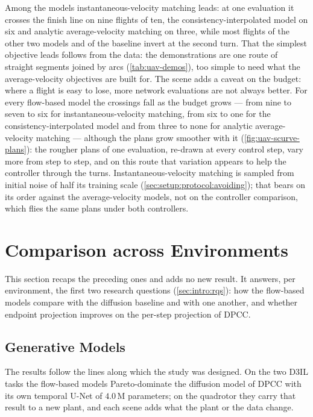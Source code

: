 Among the models instantaneous-velocity matching leads: at one evaluation it crosses the finish line on
nine flights of ten, the consistency-interpolated model on six and analytic average-velocity matching on
three, while most flights of the other two models and of the baseline invert at the second turn. That the
simplest objective leads follows from the data: the demonstrations are one route of straight segments
joined by arcs (\autoref{tab:uav-demos}), too simple to need what the average-velocity objectives are built
for. The scene adds a caveat on the budget: where a flight is easy to lose, more network evaluations are not
always better. For every flow-based model the crossings fall as the budget grows --- from nine to seven to
six for instantaneous-velocity matching, from six to one for the consistency-interpolated model and from
three to none for analytic average-velocity matching --- although the plans grow smoother with it
(\autoref{fig:uav-scurve-plans}): the rougher plans of one evaluation, re-drawn at every control step, vary
more from step to step, and on this route that variation appears to help the controller through the turns.
Instantaneous-velocity matching is sampled from initial noise of half its training scale
(\autoref{sec:setup:protocol:avoiding}); that bears on its order against the average-velocity models, not on
the controller comparison, which flies the same plans under both controllers.

\section{Comparison across Environments}\label{sec:res:summary}

This section recaps the preceding ones and adds no new result. It answers, per environment, the first two
research questions (\autoref{sec:intro:rqs}): how the flow-based models compare with the diffusion baseline
and with one another, and whether endpoint projection improves on the per-step projection of \ac{DPCC}.

\subsection{Generative Models}\label{sec:res:summary:models}

The results follow the lines along which the study was designed. On the two D3IL tasks the flow-based models
Pareto-dominate the diffusion model of \ac{DPCC} with its own temporal U-Net of $4.0$\,M parameters; on the
quadrotor they carry that result to a new plant, and each scene adds what the plant or the data change.

